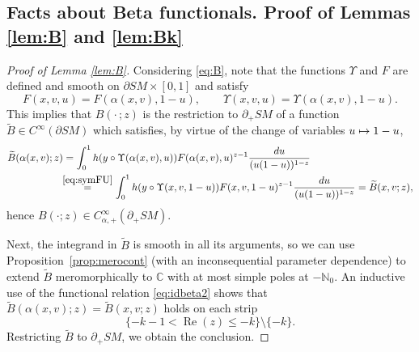 \documentclass[11pt]{article}
\newcommand{\Subsection}{\subsection}
\let\backslash\setminus
\def\mto{\mathchoice{\longmapsto}{\mapsto}{\mapsto}{\mapsto}}
\DeclareMathOperator{\Real}{Re}
\theoremstyle{plain}
\theoremstyle{definition}
\theoremstyle{remark}
\def\Cm{{\mathbb{C}}}
\def\Nm{{\mathbb{N}}}
\newcommand{\wtB}{\widetilde{B}}
\begin{document}
\Subsection{Facts about Beta functionals. Proof of Lemmas \ref{lem:B} and \ref{lem:Bk}} \label{sec:BetaFacts}

\begin{proof}[Proof of Lemma \ref{lem:B}] Considering \eqref{eq:B}, note that the functions $\Upsilon$ and $F$ are defined
and smooth on $\partial SM\times [0,1]$ and satisfy
\begin{equation}
F(x,v,u) = F(\alpha(x,v),1-u), \qquad \Upsilon (x,v,u) = \Upsilon (\alpha(x,v),1-u).
\label{eq:symFU}
\end{equation}
This implies that $B(\cdot\,; z)$ is the restriction to $\partial_+ SM$ of a function $\wtB\in C^\infty(\partial SM)$ which satisfies,
by virtue of the change of variables $u \mto 1-u$,
\begin{align*}
\wtB(\alpha(x,v); z) &= \int_0^1 h(y\circ\Upsilon(\alpha(x,v),u)) F(\alpha(x,v),u)^{z-1} \frac{du}{(u(1-u))^{1-z}} \\
&\!\!\stackrel{\eqref{eq:symFU}}{=} \int_0^1 h(y\circ\Upsilon(x,v,1-u)) F(x,v,1-u)^{z-1} \frac{du}{ (u(1-u))^{1-z}} = \wtB(x,v; z),
\end{align*}
hence $B(\cdot; z) \in C_{\alpha,+}^\infty(\partial_+ SM)$.

Next, the integrand in $\wtB$ is smooth in all its arguments, so we can use Proposition~\ref{prop:merocont} (with an
inconsequential parameter dependence) to extend $\wtB$ meromorphically to $\Cm$ with at most simple poles at $-\Nm_0$.
An inductive use of the functional relation \eqref{eq:idbeta2} shows that $\wtB(\alpha(x,v); z) = \wtB(x,v; z)$ holds on each strip
\[
\{-k-1<\Real(z)\le -k\}\backslash \{-k\}.
\]
Restricting $\wtB$ to $\partial_+ SM$, we obtain the conclusion.
\end{proof}
\end{document}
